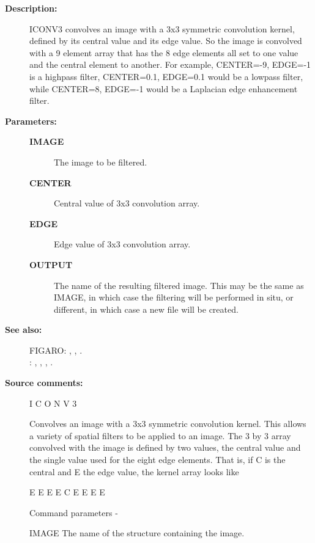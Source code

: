 \begin{description}
\begin{description}
\item [\textbf{Description:}]
 ICONV3 convolves an image with a 3x3 symmetric convolution
 kernel, defined by its central value and its edge value.  So
 the image is convolved with a 9 element array that has the 8
 edge elements all set to one value and the central element to
 another.  For example, CENTER=-9, EDGE=-1 is a highpass filter,
 CENTER=0.1, EDGE=0.1 would be a lowpass filter, while CENTER=8,
 EDGE=-1 would be a Laplacian edge enhancement filter.

\item [\textbf{Parameters:}]
\begin{description}
\item [\textbf{IMAGE}]
 The image to be filtered.
\item [\textbf{CENTER}]
 Central value of 3x3 convolution array.
\item [\textbf{EDGE}]
 Edge value of 3x3 convolution array.
\item [\textbf{OUTPUT}]
 The name of the resulting filtered image.  This may
 be the same as IMAGE, in which case the filtering
 will be performed in situ, or different, in which
 case a new file will be created.
\end{description}

\item [\textbf{See also:}]
FIGARO: , , .\\
: , , , .\\

\item [\textbf{Source comments:}]
\begin{terminalv}
 I C O N V 3

 Convolves an image with a 3x3 symmetric convolution kernel.
 This allows a variety of spatial filters to be applied to
 an image.  The 3 by 3 array convolved with the image is defined
 by two values, the central value and the single value used
 for the eight edge elements.  That is, if C is the central and
 E the edge value, the kernel array looks like

                   E  E  E
                   E  C  E
                   E  E  E

 Command parameters -

 IMAGE    The name of the structure containing the image.


\end{terminalv}
\end{description}
\end{description}
